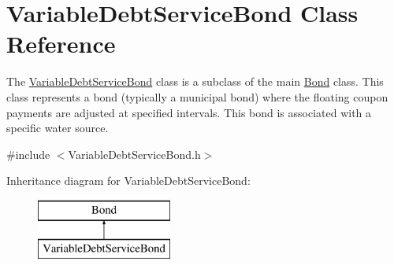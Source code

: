 \hypertarget{classVariableDebtServiceBond}{}\section{Variable\+Debt\+Service\+Bond Class Reference}
\label{classVariableDebtServiceBond}


The {\ttfamily \mbox{\hyperlink{classVariableDebtServiceBond}{Variable\+Debt\+Service\+Bond}}} class is a subclass of the main {\ttfamily \mbox{\hyperlink{classBond}{Bond}}} class. This class represents a bond (typically a municipal bond) where the floating coupon payments are adjusted at specified intervals. This bond is associated with a specific water source.  




{\ttfamily \#include $<$Variable\+Debt\+Service\+Bond.\+h$>$}

Inheritance diagram for Variable\+Debt\+Service\+Bond\+:\begin{figure}[H]
\begin{center}
\leavevmode
\includegraphics[height=2.000000cm]{classVariableDebtServiceBond}
\end{center}
\end{figure}
